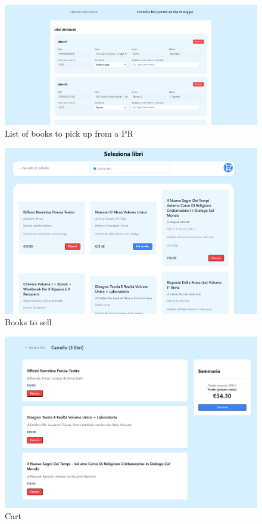 \begin{figure}[ht]
    \centering
    \includegraphics[width=.75\textwidth]{assets/ui_mockup/pickup_list.png}
    \caption{List of books to pick up from a PR}
    \label{fig:pickup_list}
\end{figure}

\begin{figure}[ht]
    \centering
    \includegraphics[width=.75\textwidth]{assets/ui_mockup/sellpage.png}
    \caption{Books to sell}
    \label{fig:sellpage}
\end{figure}

\begin{figure}[ht]
    \centering
    \includegraphics[width=.75\textwidth]{assets/ui_mockup/cart.png}
    \caption{Cart}
    \label{fig:cart}
\end{figure}

